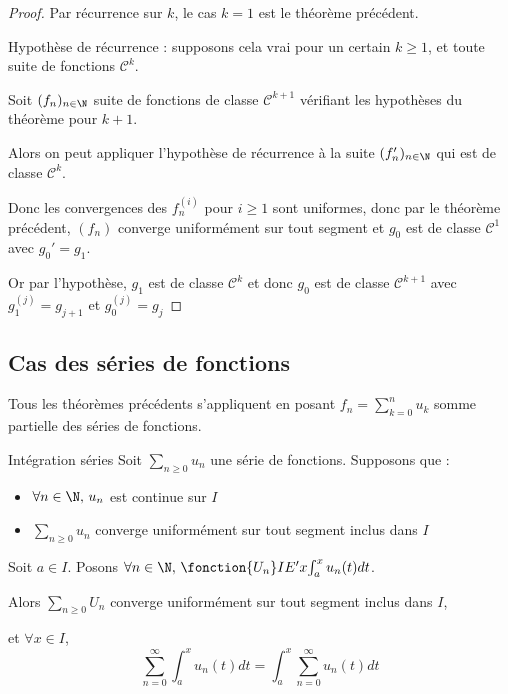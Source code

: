 
\begin{proof}
    Par récurrence sur $k$, le cas $k = 1$ est le théorème précédent.

    Hypothèse de récurrence : supposons cela vrai pour un certain $k \geqslant 1$, et toute 
    suite de fonctions $\mathscr C^k$. 

    Soit $(f_n)_{n \in \N}$ suite de fonctions de classe $\mathscr{C}^{k + 1}$ vérifiant les hypothèses du théorème pour $k + 1$.

    Alors on peut appliquer l'hypothèse de récurrence à la suite $(f_n')_{n \in \N}$ qui est de classe $\mathscr{C}^k$.

    Donc les convergences des $f_n^{(i)}$ pour $i \geqslant 1$ sont uniformes, donc 
    par le théorème précédent, $(f_n)$ converge uniformément sur tout segment et 
    $g_0$ est de classe $\mathscr{C}^1$ avec $g_0' = g_1$. 

    Or par l'hypothèse, $g_1$ est de classe $\mathscr{C}^k$ et donc $g_0$ est de classe $\mathscr{C}^{k + 1}$ avec
    $g_1^{(j)} = g_{j + 1}$ et $g_0^{(j)} = g_j$ 
\end{proof}

\subsection{Cas des séries de fonctions }

Tous les théorèmes précédents s'appliquent en posant $\displaystyle f_n = \sum_{k = 0}^n u_k$ somme partielle des 
séries de fonctions.

\begin{theoreme}{Intégration séries}{}
    Soit $\sum_{n \geqslant 0} u_n$ une série de fonctions. Supposons que : 
    \begin{itemize}
        \item $\forall n \in \N, \, u_n$ est continue sur $I$
        \item $\sum_{n \geqslant 0} u_n$ converge uniformément 
    sur tout segment inclus dans $I$
    \end{itemize}
    Soit $a \in I$. Posons $\forall n \in \N, \, \fonction{U_n} I {E'}{x}{\int_a^x u_n(t) dt}$.

    Alors $\sum_{n \geqslant 0} U_n$ converge uniformément sur tout segment inclus dans $I$, 
    
    et 
    $\forall x \in I$, 
    $$\sum_{n = 0 }^{ \infty } \int_{a }^{x } u_n(t) dt = \int_{a}^{x } \sum_{n = 0}^{\infty} u_n(t) dt$$
\end{theoreme}

